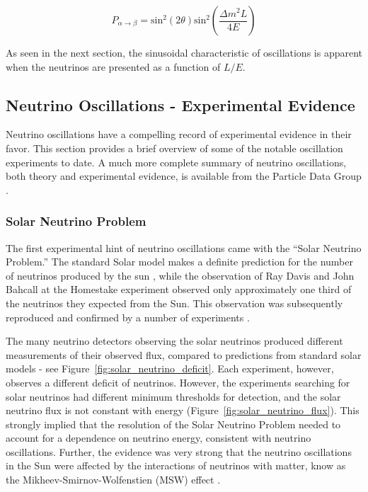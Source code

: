 \begin{equation}
P_{\alpha\rightarrow\beta} = \text{sin}^2(2\theta)\text{sin}^2\left( \frac{\Delta m^2 L}{4 E} \right)
\end{equation}

As seen in the next section, the sinusoidal characteristic of oscillations is apparent when the neutrinos are presented as a function of $L/E$.

\subsection{Neutrino Oscillations - Experimental Evidence}

Neutrino oscillations have a compelling record of experimental evidence in their favor.  This section provides a brief overview of some of the notable oscillation experiments to date.  A much more complete summary of neutrino oscillations, both theory and experimental evidence, is available from the Particle Data Group \cite{Agashe:2014kda}.

\subsubsection{Solar Neutrino Problem}

The first experimental hint of neutrino oscillations came with the ``Solar Neutrino Problem.''  The standard Solar model makes a definite prediction for the number of neutrinos produced by the sun \cite{Bahcall:2004pz}, while the observation of Ray Davis and John Bahcall at the Homestake experiment observed only approximately one third of the neutrinos they expected from the Sun.  This observation was subsequently reproduced and confirmed by a number of experiments \cite{Hampel:1998xg, Fukuda:1996sz, Gavrin:2005ks, Anselmann:1992um, Altmann:2005ix, Fukuda:2002pe, Ahmad:2001an, Ahmad:2002jz}.

The many neutrino detectors observing the solar neutrinos produced different measurements of their observed flux, compared to predictions from standard solar models - see Figure~\ref{fig:solar_neutrino_deficit}.  Each experiment, however, observes a different deficit of neutrinos.  However, the experiments searching for solar neutrinos had different minimum thresholds for detection, and the solar neutrino flux is not constant with energy (Figure~\ref{fig:solar_neutrino_flux}).  This strongly implied that the resolution of the Solar Neutrino Problem needed to account for a dependence on neutrino energy, consistent with neutrino oscillations.  Further, the evidence was very strong that the neutrino oscillations in the Sun were affected by the interactions of neutrinos with matter, know as the Mikheev-Smirnov-Wolfenstien (MSW) effect \cite{Wolfenstein:1977ue,Mikheev:1986gs}.

